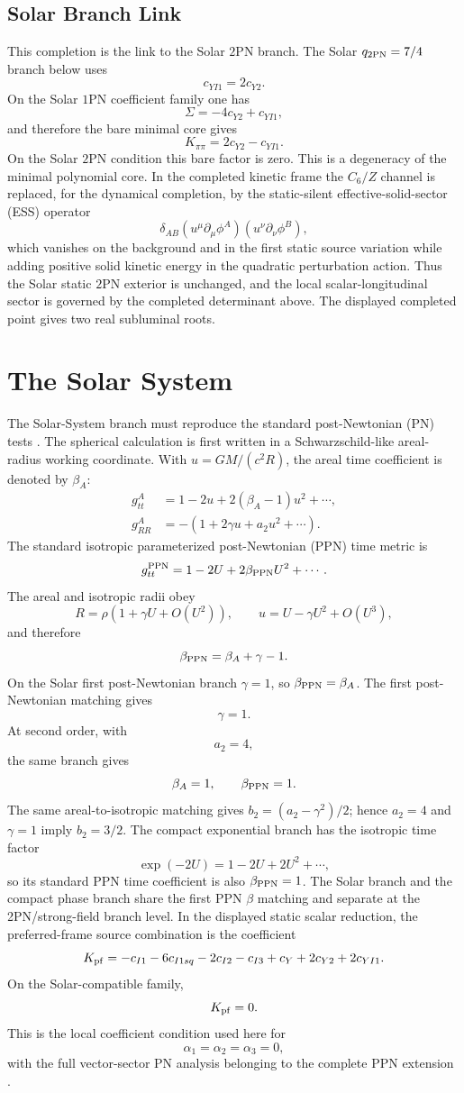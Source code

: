 \documentclass[12pt,a4paper]{article}
\begin{document}
\subsection{Solar Branch Link}

This completion is the link to the Solar $2$PN branch. The Solar
$q_{2{\rm PN}}=7/4$ branch below uses
\[
c_{YI1}=2c_{Y2}.
\]
On the Solar $1$PN coefficient family one has
\[
\Sigma=-4c_{Y2}+c_{YI1},
\]
and therefore the bare minimal core gives
\[
K_{\pi\pi}=2c_{Y2}-c_{YI1}.
\]
On the Solar $2$PN condition this bare factor is zero. This is a degeneracy of
the minimal polynomial core. In the completed kinetic frame the $C_6/Z$
channel is replaced, for the dynamical completion, by the static-silent
effective-solid-sector (ESS) operator
\[
\delta_{AB}(u^\mu\partial_\mu\phi^A)(u^\nu\partial_\nu\phi^B),
\]
which vanishes on the background and in the first static source variation while
adding positive solid kinetic energy in the quadratic perturbation action. Thus
the Solar static $2$PN exterior is unchanged, and the local scalar-longitudinal
sector is governed by the completed determinant above.  The displayed completed
point gives two real subluminal roots.

\section{The Solar System}

The Solar-System branch must reproduce the standard post-Newtonian (PN) tests \cite{Will1993,Will2014,Bertotti2003}. The spherical calculation is first written in a Schwarzschild-like areal-radius working coordinate. With $u=GM/(c^2R)$, the areal time coefficient is denoted by $\beta_A$:
\begin{align*}
g_{tt}^{A}&=1-2u+2(\beta_A-1)u^2+\cdots,\\
g_{RR}^{A}&=-(1+2\gamma u+a_2u^2+\cdots).
\end{align*}
The standard isotropic parameterized post-Newtonian (PPN) time metric is
\[
g_{tt}^{\rm PPN}=1-2U+2\beta_{\rm PPN}U^2+\cdots.
\]
The areal and isotropic radii obey
\[
R=\rho(1+\gamma U+O(U^2)),\qquad
u=U-\gamma U^2+O(U^3),
\]
and therefore
\[
\beta_{\rm PPN}=\beta_A+\gamma-1.
\]
On the Solar first post-Newtonian branch $\gamma=1$, so $\beta_{\rm PPN}=\beta_A$. The first post-Newtonian matching gives
\[
\gamma=1.
\]
At second order, with
\[
a_2=4,
\]
the same branch gives
\[
\beta_A=1,
\qquad
\beta_{\rm PPN}=1.
\]
The same areal-to-isotropic matching gives $b_2=(a_2-\gamma^2)/2$; hence
$a_2=4$ and $\gamma=1$ imply $b_2=3/2$.
The compact exponential branch has the isotropic time factor
\[
\exp(-2U)=1-2U+2U^2+\cdots,
\]
so its standard PPN time coefficient is also $\beta_{\rm PPN}=1$. The Solar branch and the compact phase branch share the first PPN $\beta$ matching and separate at the 2PN/strong-field branch level.
In the displayed static scalar reduction, the preferred-frame source
combination is the coefficient
\[
K_{\rm pf}
=-c_{I1}-6c_{I1sq}-2c_{I2}-c_{I3}
+c_Y+2c_{Y2}+2c_{YI1}.
\]
On the Solar-compatible family,
\[
K_{\rm pf}=0.
\]
This is the local coefficient condition used here for
\[
\alpha_1=\alpha_2=\alpha_3=0,
\]
with the full vector-sector PN analysis belonging to the complete PPN extension
\cite{WillNordtvedt1972,Kostelecky2022}.
\end{document}
